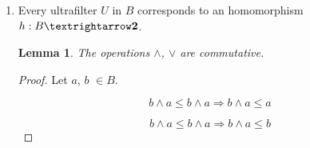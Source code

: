 \documentclass{article}
\newtheorem{lemma}{Lemma}
\begin{document}
\begin{enumerate}
\begin{enumerate}
       Let $U = h^{-1}(TOP)$.

       First, prove that $U$ is a filter.

       \begin{itemize}
         \item
           Let $a ∈ U$. Then $h(a) = TOP$

           Let $b ∈ B$ such that $a ≤ b$. $h$ is an homomorphism, which
           preserves the ordering therefore $TOP = h(a) ≤ h(b)$.

           On the other hand, $h(b) ≤ TOP$ because $\text{\bf 2}$ is a
           boolean algebra. So, $h(b) = TOP$, and $b ∈ U$.

         \item

           Let $a, b ∈ u$. Then $h(a), h(b) = TOP$.

           $h$ is an homomorphism; which implies $h(a ∧ b) = h(a) ∧ h(b) = TOP ∧ TOP$.

           For all elements x, $x ≤ TOP$. Therefore, we have

           $$TOP ≤ TOP ∧ TOP ≤ TOP$$

           Finally, $h(a ∧ b) = TOP$, so $(a ∧ b) ∈ U$.

      \end{itemize}

      $U$ is non-trivial, as $h(BOT) = BOT ≠ TOP$.

      Now, assume that $U$ is not an ultrafilter. Then, there exists
      some filter $U^\prime$, $U^\prime \subsetneq U$, $U^\prime ≠ B$.
           
      Let $x ∈ U^\prime \setminus U$. Then, $h(x) = BOT$, and
      $h(¬x) = TOP$, so $¬x ∈ U \subset U^\prime$. This contradicts
      lemma \ref{lem:neg}.

   \item Every ultrafilter $U$ in $B$ corresponds to an homomorphism $h : B → \text{\bf 2}$.

     
     \begin{lemma}\label{lem:commutative}
       The operations $∧$, $∨$ are commutative.
     \end{lemma}

     \begin{proof}
       Let $a$, $b$ $∈ B$.
       
       $$b ∧ a ≤ b ∧ a \Rightarrow b ∧ a ≤ a$$

       $$b ∧ a ≤ b ∧ a \Rightarrow b ∧ a ≤ b$$
       

\end{proof}
\end{enumerate}
\end{enumerate}
\end{document}
